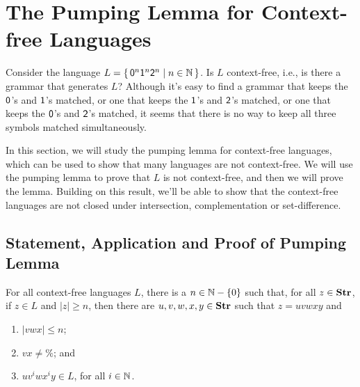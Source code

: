 \section{The Pumping Lemma for Context-free Languages}
\label{ThePumpingLemmaForContextFreeLanguages}

%
%

Consider the language $L =
\{ \, \mathsf{0}^n\mathsf{1}^n\mathsf{2}^n \mid n\in\mathbb{N} \, \}$.  Is $L$ context-free,
i.e., is there a grammar that generates $L$?  Although it's easy to
find a grammar that keeps the $\mathsf{0}$'s and $\mathsf{1}$'s matched, or
one that keeps the $\mathsf{1}$'s and $\mathsf{2}$'s matched, or one that
keeps the $\mathsf{0}$'s and $\mathsf{2}$'s matched, it seems that there is
no way to keep all three symbols matched simultaneously.

In this section, we will study the pumping lemma for context-free
languages, which can be used to show that many languages are not
context-free.  We will use the pumping lemma to prove that $L$ is not
context-free, and then we will prove the lemma.  Building on this
result, we'll be able to show that the context-free languages are not
closed under intersection, complementation or set-difference.

\subsection{Statement, Application and Proof of Pumping Lemma}

\begin{lemma}
For all context-free languages $L$, there is a
$n\in\mathbb{N}-\{0\}$ such that, for all $z\in\mathbf{Str}$, if $z\in L$
and $|z|\geq n$, then there are $u,v,w,x,y\in\mathbf{Str}$ such
that $z=uvwxy$ and
\begin{enumerate}[\quad(1)]
\item $|vwx|\leq n$;

\item $vx\neq\%$; and

\item $uv^iwx^iy\in L$, for all $i\in\mathbb{N}$.
\end{enumerate}
\end{lemma}

